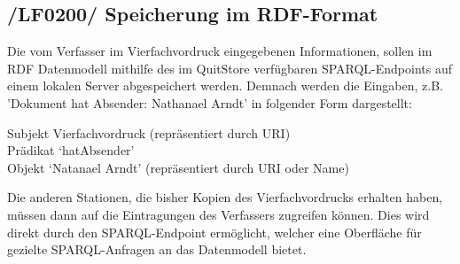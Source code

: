 \subsection{/LF0200/ Speicherung im RDF-Format}
Die vom Verfasser im Vierfachvordruck eingegebenen Informationen, sollen im RDF Datenmodell mithilfe des im QuitStore verfügbaren SPARQL-Endpoints auf einem lokalen Server abgespeichert werden. Demnach werden die Eingaben, z.B. 'Dokument hat Absender: Nathanael Arndt' in folgender Form dargestellt:
\begin{flushleft}
\quad \quad \quad Subjekt Vierfachvordruck (repräsentiert durch URI) \\
\quad \quad \quad Prädikat `hatAbsender' \\
\quad \quad \quad Objekt `Natanael Arndt' (repräsentiert durch URI oder Name)
\end{flushleft}
Die anderen Stationen, die bisher Kopien des Vierfachvordrucks erhalten haben, müssen dann auf die Eintragungen des Verfassers zugreifen können. Dies wird direkt durch den SPARQL-Endpoint ermöglicht, welcher eine Oberfläche für gezielte SPARQL-Anfragen an das Datenmodell bietet.